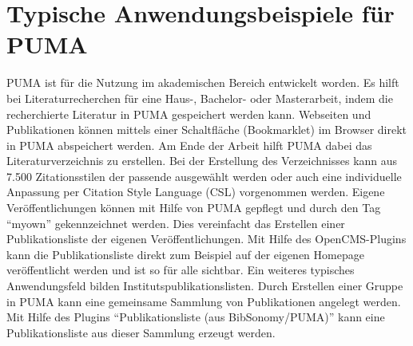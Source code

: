 \section{Typische Anwendungsbeispiele für PUMA}
\label{sec:typischeAnwendung}
PUMA ist für die Nutzung im akademischen Bereich entwickelt worden.
Es hilft bei Literaturrecherchen für eine Haus-, Bachelor- oder Masterarbeit, 
indem die recherchierte Literatur in PUMA gespeichert werden kann. Webseiten und 
Publikationen können mittels einer Schaltfläche (Bookmarklet) im Browser direkt 
in PUMA abspeichert werden. Am Ende der Arbeit hilft PUMA dabei das 
Literaturverzeichnis zu erstellen. Bei der Erstellung des Verzeichnisses kann 
aus 7.500 Zitationsstilen der passende ausgewählt werden oder auch eine 
individuelle Anpassung per Citation Style Language (CSL) vorgenommen werden.
\newline 
Eigene Veröffentlichungen können mit Hilfe von PUMA gepflegt und  durch den Tag 
\enquote{myown} gekennzeichnet werden. Dies vereinfacht das Erstellen einer 
Publikationsliste der eigenen Veröffentlichungen. Mit Hilfe des 
OpenCMS-Plugins kann die Publikationsliste direkt zum Beispiel auf der eigenen 
Homepage veröffentlicht werden und ist so für alle sichtbar.
\newline 
Ein weiteres typisches Anwendungsfeld bilden Institutspublikationslisten. 
Durch Erstellen einer Gruppe in PUMA kann eine gemeinsame Sammlung von 
Publikationen angelegt werden. Mit Hilfe des Plugins 
\enquote{Publikationsliste (aus BibSonomy/PUMA)}  kann eine Publikationsliste aus dieser 
Sammlung erzeugt werden.

   

